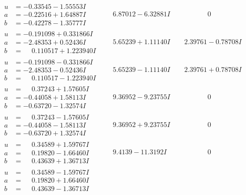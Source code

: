 \documentclass[1p]{elsarticle_modified}
\theoremstyle{definition}
\begin{document}
$$\begin{array}{c|c|c}
\begin{aligned}
u &= -0.33545 - 1.55553 I \\
a &= -0.22516 + 1.64887 I \\
b &= -0.42278 - 1.35777 I\end{aligned}
 & \phantom{-}6.87012 - 6.32881 I & \phantom{-0.000000 } 0 \\ \hline\begin{aligned}
u &= -0.191098 + 0.331866 I \\
a &= -2.48353 + 0.52436 I \\
b &= \phantom{-}0.110517 + 1.223940 I\end{aligned}
 & \phantom{-}5.65239 + 1.11140 I & \phantom{-}2.39761 - 0.78708 I \\ \hline\begin{aligned}
u &= -0.191098 - 0.331866 I \\
a &= -2.48353 - 0.52436 I \\
b &= \phantom{-}0.110517 - 1.223940 I\end{aligned}
 & \phantom{-}5.65239 - 1.11140 I & \phantom{-}2.39761 + 0.78708 I \\ \hline\begin{aligned}
u &= \phantom{-}0.37243 + 1.57605 I \\
a &= -0.44058 + 1.58113 I \\
b &= -0.63720 - 1.32574 I\end{aligned}
 & \phantom{-}9.36952 - 9.23755 I & \phantom{-0.000000 } 0 \\ \hline\begin{aligned}
u &= \phantom{-}0.37243 - 1.57605 I \\
a &= -0.44058 - 1.58113 I \\
b &= -0.63720 + 1.32574 I\end{aligned}
 & \phantom{-}9.36952 + 9.23755 I & \phantom{-0.000000 } 0 \\ \hline\begin{aligned}
u &= \phantom{-}0.34589 + 1.59767 I \\
a &= \phantom{-}0.19820 - 1.66460 I \\
b &= \phantom{-}0.43639 + 1.36713 I\end{aligned}
 & \phantom{-}9.4139 - 11.3192 I & \phantom{-0.000000 } 0 \\ \hline\begin{aligned}
u &= \phantom{-}0.34589 - 1.59767 I \\
a &= \phantom{-}0.19820 + 1.66460 I \\
b &= \phantom{-}0.43639 - 1.36713 I\end{aligned}

\end{array}$$
\end{document}
